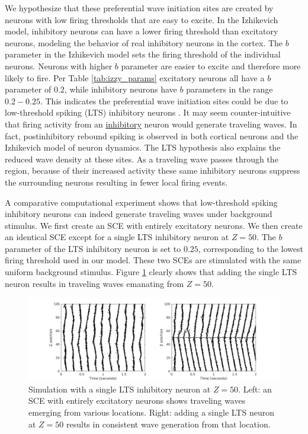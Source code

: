 \documentclass[12pt]{article}
\begin{document}
We hypothesize that these preferential wave initiation sites are created by neurons with low firing thresholds that are easy to excite.
In the Izhikevich model, inhibitory neurons can have a lower firing threshold than excitatory neurons, modeling the behavior of real inhibitory neurons in the cortex\parencite{gibson2009}\parencite{hayut2011}.
The $b$ parameter in the Izhikevich model sets the firing threshold of the individual neurons.
Neurons with higher $b$ parameter are easier to excite and therefore more likely to fire.
Per Table \ref{tab:izzy_params} excitatory neurons all have a $b$ parameter of $0.2$, while inhibitory neurons have $b$ parameters in the range $0.2-0.25$.
This indicates the preferential wave initiation sites could be due to low-threshold spiking (LTS) inhibitory neurons \parencite{izhikevich2003}.
It may seem counter-intuitive that firing activity from an \underline{inhibitory} neuron would generate traveling waves.
In fact, postinhibitory rebound spiking is observed in both cortical neurons \parencite{ascoli2010} and the Izhikevich model of neuron dynamics.
The LTS hypothesis also explains the reduced wave density at these sites.
As a traveling wave passes through the region, because of their increased activity these same inhibitory neurons suppress the surrounding neurons resulting in fewer local firing events.

A comparative computational experiment shows that low-threshold spiking inhibitory neurons can indeed generate traveling waves under background stimulus.
We first create an SCE with entirely excitatory neurons.
We then create an identical SCE except for a single LTS inhibitory neuron at $Z=50$.
The $b$ parameter of the LTS inhibitory neuron is set to $0.25$, corresponding to the lowest firing threshold used in our model.
These two SCEs are stimulated with the same uniform background stimulus. 
Figure \ref{fig:lts_inhibit} clearly shows that adding the single LTS neuron results in traveling waves emanating from $Z=50$. 
\begin{figure}[!htb]
 \caption{Simulation with a single LTS inhibitory neuron at $Z=50$. Left: an SCE with entirely excitatory neurons shows traveling waves emerging from various locations. Right: adding a single LTS neuron at $Z=50$ results in consistent wave generation from that location. }
 \label{fig:lts_inhibit}
 \centering
   \includegraphics[width=\textwidth]{fig/SingleLTSInhibit}
\end{figure}
\end{document}
